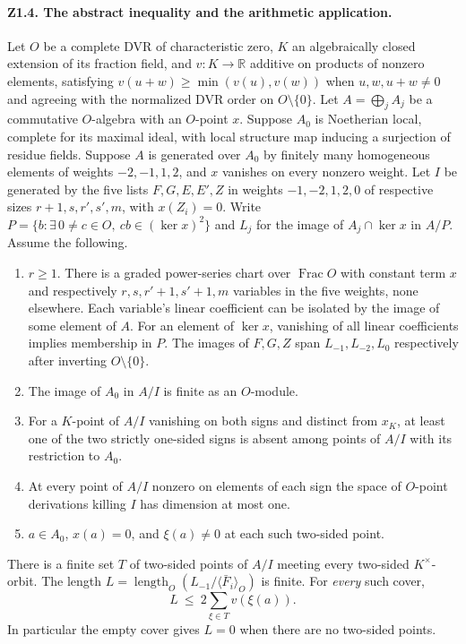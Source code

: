 \paragraph{Z1.4. The abstract inequality and the arithmetic application.}
\begin{theorem}\label{thm:P-r5-lemma-m}
Let $O$ be a complete DVR of characteristic zero, $K$ an algebraically
closed extension of its fraction field, and $v:K\to\mathbb R$ additive on
products of nonzero elements, satisfying $v(u+w)\geq\min(v(u),v(w))$
when $u,w,u+w\ne0$ and agreeing with the normalized DVR order on
$O\setminus\{0\}$. Let $A=\bigoplus_j A_j$ be a commutative
$O$-algebra with an $O$-point $x$. Suppose $A_0$ is Noetherian local,
complete for its maximal ideal, with local structure map inducing a
surjection of residue fields. Suppose $A$ is generated over $A_0$ by
finitely many homogeneous elements of weights $-2,-1,1,2$, and $x$
vanishes on every nonzero weight. Let $I$ be generated by the five
lists $F,G,E,E',Z$ in weights $-1,-2,1,2,0$ of respective sizes
$r+1,s,r',s',m$, with $x(Z_i)=0$. Write
$P=\{b:\exists\,0\ne c\in O,\ cb\in(\ker x)^2\}$ and
$L_j$ for the image of $A_j\cap\ker x$ in $A/P$. Assume the following.
\begin{enumerate}
\item $r\ge1$. There is a graded power-series chart over
$\operatorname{Frac}O$ with constant term $x$ and respectively
$r,s,r'+1,s'+1,m$ variables in the five weights, none elsewhere.
Each variable's linear coefficient can be isolated by the image of
some element of $A$. For an element of $\ker x$, vanishing of all
linear coefficients implies membership in $P$. The images of $F,G,Z$
span $L_{-1},L_{-2},L_0$ respectively after inverting $O\setminus\{0\}$.
\item The image of $A_0$ in $A/I$ is finite as an $O$-module.
\item For a $K$-point of $A/I$ vanishing on both signs and distinct
from $x_K$, at least one of the two strictly one-sided signs is absent
among points of $A/I$ with its restriction to $A_0$.
\item At every point of $A/I$ nonzero on elements of each sign
the space of $O$-point derivations killing $I$ has dimension at most one.
\item $a\in A_0$, $x(a)=0$, and $\xi(a)\ne0$ at each such two-sided point.
\end{enumerate}
There is a finite set $T$ of two-sided points of $A/I$ meeting every
two-sided $K^\times$-orbit. The length
$L=\operatorname{length}_O(L_{-1}/\langle \bar F_i\rangle_O)$ is finite.
For \emph{every} such cover,
\[
                         L\ \leq\ 2\sum_{\xi\in T}v(\xi(a)).
\]
In particular the empty cover gives $L=0$ when there are no two-sided points.
\end{theorem}
